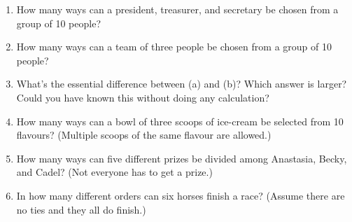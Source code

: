         \begin{exercise}
            \begin{enumerate}
                \item How many ways can a president, treasurer, and secretary be chosen from a group of 10 people?
                \item How many ways can a team of three people be chosen from a group of 10 people?
                \item What's the essential difference between (a) and (b)? Which answer is larger? Could you have known this without doing any calculation?
                \item How many ways can a bowl of three scoops of ice-cream be selected from 10 flavours? (Multiple scoops of the same flavour are allowed.)
                \item How many ways can five different prizes be divided among Anastasia, Becky, and Cadel? (Not everyone has to get a prize.)
                \item In how many different orders can six horses finish a race? (Assume there are no ties and they all do finish.)
            \end{enumerate}
        \end{exercise}
